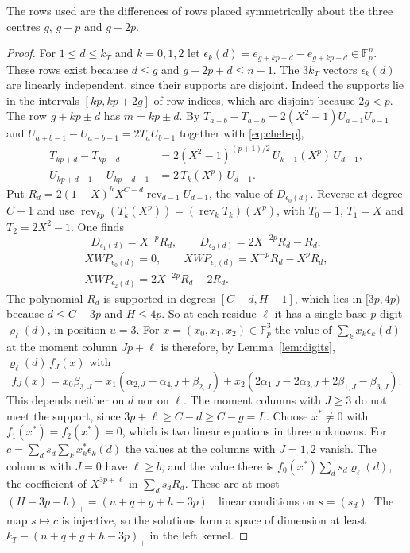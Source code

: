 \documentclass[11pt]{amsart}
\theoremstyle{definition}
\theoremstyle{remark}
\numberwithin{equation}{section}
\newcommand{\F}{\mathbb F}
\begin{document}
The rows used are the differences of rows placed symmetrically about the three centres $g$, $g+p$ and
$g+2p$.

\begin{proof}
For $1\le d\le k_T$ and $k=0,1,2$ let $\epsilon_k(d)=e_{g+kp+d}-e_{g+kp-d}\in\F_p^n$. These rows exist
because $d\le g$ and $g+2p+d\le n-1$. The $3k_T$ vectors $\epsilon_k(d)$ are linearly independent, since their
supports are disjoint. Indeed the supports lie in the intervals $[kp,kp+2g]$ of row indices, which are
disjoint because $2g<p$. The row $g+kp\pm d$ has $m=kp\pm d$. By $T_{a+b}-T_{a-b}=2(X^2-1)U_{a-1}U_{b-1}$
and $U_{a+b-1}-U_{a-b-1}=2T_aU_{b-1}$ together with \eqref{eq:cheb-p},
\begin{align*}
 T_{kp+d}-T_{kp-d}&=2(X^2-1)^{(p+1)/2}\,U_{k-1}(X^p)\,U_{d-1},\\
 U_{kp+d-1}-U_{kp-d-1}&=2\,T_k(X^p)\,U_{d-1}.
\end{align*}
Put $R_d=2(1-X)^hX^{C-d}\operatorname{rev}_{d-1}U_{d-1}$, the value of $D_{\epsilon_0(d)}$. Reverse at degree
$C-1$ and use $\operatorname{rev}_{kp}(T_k(X^p))=(\operatorname{rev}_kT_k)(X^p)$, with $T_0=1$, $T_1=X$ and
$T_2=2X^2-1$. One finds
\[
 D_{\epsilon_1(d)}=X^{-p}R_d,\qquad D_{\epsilon_2(d)}=2X^{-2p}R_d-R_d,
\]
\begin{gather*}
 XWP_{\epsilon_0(d)}=0,\qquad XWP_{\epsilon_1(d)}=X^{-p}R_d-X^pR_d,\\
 XWP_{\epsilon_2(d)}=2X^{-2p}R_d-2R_d .
\end{gather*}
The polynomial $R_d$ is supported in degrees $[C-d,H-1]$, which lies in $[3p,4p)$ because $d\le C-3p$ and
$H\le4p$. So at each residue $\ell$ it has a single base-$p$ digit $\varrho_\ell(d)$, in position $u=3$. For
$x=(x_0,x_1,x_2)\in\F_p^3$ the value of $\sum_kx_k\epsilon_k(d)$ at the moment column $Jp+\ell$ is therefore,
by Lemma~\ref{lem:digits}, $\varrho_\ell(d)\,f_J(x)$ with
\[
 f_J(x)=x_0\beta_{3,J}+x_1(\alpha_{2,J}-\alpha_{4,J}+\beta_{2,J})+x_2(2\alpha_{1,J}-2\alpha_{3,J}+2\beta_{1,J}-\beta_{3,J}).
\]
This depends neither on $d$ nor on $\ell$. The moment columns with $J\ge3$ do not meet the support, since
$3p+\ell\ge C-d\ge C-g=L$. Choose $x^*\ne0$ with $f_1(x^*)=f_2(x^*)=0$, which is two linear equations in three
unknowns. For $c=\sum_ds_d\sum_kx^*_k\epsilon_k(d)$ the values at the columns with $J=1,2$ vanish. The columns
with $J=0$ have $\ell\ge b$, and the value there is $f_0(x^*)\sum_ds_d\varrho_\ell(d)$, the coefficient of
$X^{3p+\ell}$ in $\sum_ds_dR_d$. These are at most $(H-3p-b)_+=(n+q+g+h-3p)_+$ linear conditions on
$s=(s_d)$. The map $s\mapsto c$ is injective, so the solutions form a space of dimension at least
$k_T-(n+q+g+h-3p)_+$ in the left kernel.
\end{proof}
\end{document}
